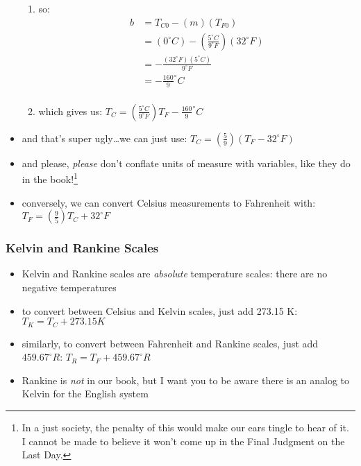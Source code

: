 \documentclass[11pt, oneside]{article}   	%
\begin{document}
\begin{itemize}
\begin{enumerate}
\item so:
\begin{equation} 
\boxed{
\begin{split}
   b &= T_{C0} - ( m ) ( T_{F0}) \\
      &= ( 0^{\circ}C ) - (\frac{5^{\circ}C}{9^{\circ} F} ) ( 32^{\circ} F ) \\
      &= - \frac{(32^{\circ} F)(5^{\circ}C)}{9^{\circ} F} \\
      &= - \frac{160}{9} ^{\circ} C  \\
 \end{split}
 }
\end{equation}
\item which gives us: $T_C = (\frac{5^{\circ}C}{9^{\circ} F}) T_F -  \frac{160}{9} ^{\circ} C $
\end{enumerate}
\item and that's super ugly\ldots we can just use: $T_C = (\frac{5}{9})(T_F - 32^{\circ} F)$ \cite[p. 45]{wile-chem-2}
\item and please, \emph{please} don't conflate units of measure with variables, like they do in the book!\footnote{In a just society, the penalty of this would make our ears tingle to hear of it. 
I cannot be made to believe it won't come up in the Final Judgment on the Last Day.}
\item conversely, we can convert Celsius measurements to Fahrenheit with: $T_F = (\frac{9}{5}) T_C + 32^{\circ} F$  \cite[p. 46]{wile-chem-2}
\end{itemize}

\subsubsection{Kelvin and Rankine Scales}
\begin{itemize}
\item Kelvin and Rankine scales are \emph{absolute} temperature scales: there are no negative temperatures
\item to convert between Celsius and Kelvin scales, just add 273.15 K: $T_K = T_C + 273.15 K $ \cite[p. 46]{wile-chem-2}
\item similarly, to convert between Fahrenheit and Rankine scales, just add $459.67 ^{\circ} R$: $T_R = T_F + 459.67 ^{\circ} R$
\item Rankine is \emph{not} in our book, but I want you to be aware there is an analog to Kelvin for the English system
\end{itemize}
\end{document}
